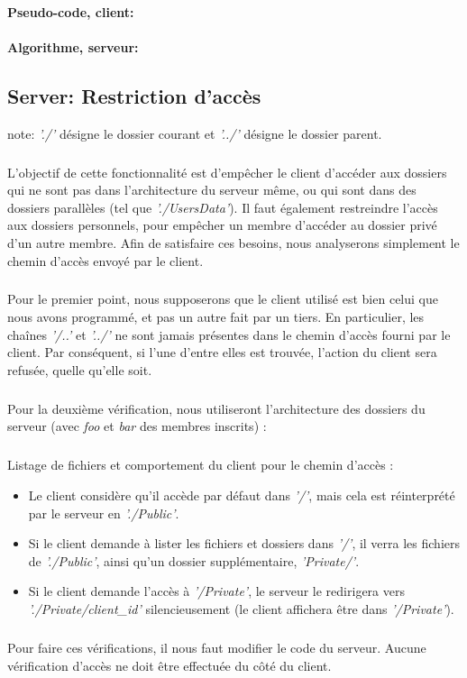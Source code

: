 \documentclass[12pt,a4paper,twoside]{article}
\begin{document}
			\paragraph*{Pseudo-code, client:}
				
			\paragraph*{Algorithme, serveur:}
				
				
		\subsection{Server: Restriction d'accès} %
			note: \textit{'./'} désigne le dossier courant et \textit{'../'} désigne le dossier parent.
			\subparagraph*{}
				L'objectif de cette fonctionnalité est d'empêcher le client d'accéder aux dossiers qui ne sont pas dans l'architecture du serveur même, ou qui sont dans des dossiers parallèles (tel que \textit{'./UsersData'}). Il faut également restreindre l'accès aux dossiers personnels, pour empêcher un membre d'accéder au dossier privé d'un autre membre.
				Afin de satisfaire ces besoins, nous analyserons simplement le chemin d'accès envoyé par le client.
			\subparagraph*{}
				Pour le premier point, nous supposerons que le client utilisé est bien celui que nous avons programmé, et pas un autre fait par un tiers. En particulier, les chaînes \textit{'/..'} et \textit{'../'} ne sont jamais présentes dans le chemin d'accès fourni par le client. Par  conséquent, si l'une d'entre elles est trouvée, l'action du client sera refusée, quelle qu'elle soit.
			\subparagraph*{}
				Pour la deuxième vérification, nous utiliseront l'architecture des dossiers du serveur (avec \textit{foo} et \textit{bar} des membres inscrits) :
				\begin{samepage}
					
				\end{samepage}
			\subparagraph*{}
				Listage de fichiers et comportement du client pour le chemin d'accès :
				\begin{itemize}
					\item{} Le client considère qu'il accède par défaut dans \textit{'/'}, mais cela est réinterprété par le serveur en \textit{'./Public'}.
					\item{} Si le client demande à lister les fichiers et dossiers dans \textit{'/'}, il verra les fichiers de \textit{'./Public'}, ainsi qu'un dossier supplémentaire, \textit{'Private/'}.
					\item{} Si le client demande l'accès à \textit{'/Private'}, le serveur le redirigera vers \textit{'./Private/client\_id'} silencieusement (le client affichera être dans \textit{'/Private'}).
				 \end{itemize}
			\subparagraph*{}
				Pour faire ces vérifications, il nous faut modifier le code du serveur. Aucune vérification d'accès ne doit être effectuée du côté du client.
\end{document}
